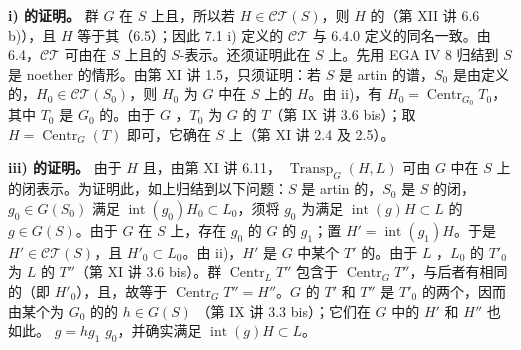 \textbf{i) 的证明。} 群 $G$ 在 $S$ 上且，所以若 $H\in\mathcal{CT}(S)$，则 $H$ 的（第 XII 讲 6.6 b)），且 $H$ 等于其（6.5）；因此 7.1 i) 定义的 $\mathcal{CT}$ 与 6.4.0 定义的同名一致。由 6.4，$\mathcal{CT}$ 可由在 $S$ 上且的 $S$-表示。还须证明此在 $S$ 上。先用 EGA IV 8 归结到 $S$ 是 noether 的情形。由第 XI 讲 1.5，只须证明：若 $S$ 是 artin 的谱，$S_0$ 是由定义的，$H_0\in\mathcal{CT}(S_0)$，则 $H_0$ 为 $G$ 中在 $S$ 上的 $H$。由 ii)，有 $H_0=\operatorname{Centr}_{G_0}T_0$，其中 $T_0$ 是 $G_0$ 的。由于 $G$ ，$T_0$ 为 $G$ 的 $T$（第 IX 讲 3.6 bis）；取 $H=\operatorname{Centr}_G(T)$ 即可，它确在 $S$ 上（第 XI 讲 2.4 及 2.5）。

\textbf{iii) 的证明。} 由于 $H$ 且，由第 XI 讲 6.11， $\operatorname{Transp}_G(H,L)$ 可由 $G$ 中在 $S$ 上的闭表示。为证明此，如上归结到以下问题：$S$ 是 artin 的，$S_0$ 是 $S$ 的闭，$g_0\in G(S_0)$ 满足 $\operatorname{int}(g_0)H_0\subset L_0$，须将 $g_0$ 为满足 $\operatorname{int}(g)H\subset L$ 的 $g\in G(S)$。由于 $G$ 在 $S$ 上，存在 $g_0$ 的 $G$ 的 $g_1$；置 $H'=\operatorname{int}(g_1)H$。于是 $H'\in\mathcal{CT}(S)$，且 $H'_0\subset L_0$。由 ii)，$H'$ 是 $G$ 中某个 $T'$ 的。由于 $L$ ，$L_0$ 的 $T'_0$ 为 $L$ 的 $T''$（第 XI 讲 3.6 bis）。群 $\operatorname{Centr}_L T''$ 包含于 $\operatorname{Centr}_G T''$，与后者有相同的（即 $H'_0$），且，故等于 $\operatorname{Centr}_G T''=H''$。$G$ 的 $T'$ 和 $T''$ 是 $T'_0$ 的两个，因而由某个为 $G_0$ 的的 $h\in G(S)$ （第 IX 讲 3.3 bis）；它们在 $G$ 中的 $H'$ 和 $H''$ 也如此。 $g=hg_1$  $g_0$，并确实满足 $\operatorname{int}(g)H\subset L$。

